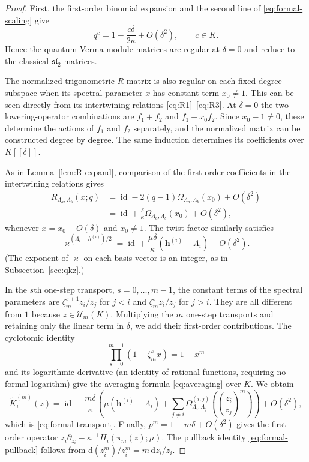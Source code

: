 \documentclass[12pt]{amsart}
\let\frak\mathfrak
\theoremstyle{definition}
\numberwithin{equation}{section}
\theoremstyle{definition}
\let\mc\mathcal
\let\ka\kappa
\let\La\Lambda
\let\Om\Omega
\let\on\operatorname
\def\id{\on{id}}
\def\slt{{\frak{sl}_2}}
\begin{document}
\begin{proof}
First, the first-order binomial expansion and the second
line of \eqref{eq:formal-scaling} give
\[
 q^c=1-\frac{c\delta}{2\ka}+O(\delta^2),\qquad c\in K.
\]
Hence the quantum Verma-module matrices are regular at
$\delta=0$ and reduce to the classical $\slt$ matrices.

The normalized trigonometric $R$-matrix is also regular on each
fixed-degree subspace when its spectral parameter $x$ has
constant term $x_0\ne1$.  This can be seen directly from its
intertwining relations \eqref{eq:R1}--\eqref{eq:R3}.  At
$\delta=0$ the two lowering-operator combinations are
$f_1+f_2$ and $f_1+x_0f_2$.
Since $x_0-1\ne0$, these determine the actions of $f_1$
and $f_2$ separately, and the normalized matrix can be
constructed degree by degree.  The same induction determines
its coefficients over $K[[\delta]]$.

As in Lemma~\ref{lem:R-expand}, comparison of the
first-order coefficients in the intertwining relations gives
\[
\begin{aligned}
 R_{\La_a,\La_b}(x;q)
  &=\id-2(q-1)\Om_{\La_a,\La_b}(x_0)+O(\delta^2)\\
  &=\id+\frac{\delta}{\ka}\Om_{\La_a,\La_b}(x_0)
    +O(\delta^2),
\end{aligned}
\]
whenever $x=x_0+O(\delta)$ and $x_0\ne1$.
The twist factor similarly satisfies
\[
 \varkappa^{(\La_i-h^{(i)})/2}
 =\id+\frac{\mu\delta}{\ka}
       (\mathbf h^{(i)}-\La_i)+O(\delta^2).
\]
(The exponent of $\varkappa$ on each basis vector is an
integer, as in Subsection~\ref{sec:qkz}.)

In the $s$th one-step transport, $s=0,\ldots,m-1$,
the constant terms of the spectral parameters are
$\zeta_m^{s+1}z_i/z_j$ for $j<i$ and
$\zeta_m^sz_i/z_j$ for $j>i$.  They are all different
from $1$ because $z\in\mc U_m(K)$.
Multiplying the $m$ one-step transports and retaining only
the linear term in $\delta$, we add their first-order
contributions.  The cyclotomic identity
\[
 \prod_{s=0}^{m-1}(1-\zeta_m^s x)=1-x^m
\]
and its logarithmic derivative (an identity of rational
functions, requiring no formal logarithm) give the averaging
formula \eqref{eq:averaging} over $K$.  We obtain
\[
 \widetilde K_i^{(m)}(z)
 =\id+\frac{m\delta}{\ka}
 \left(\mu(\mathbf h^{(i)}-\La_i)
   +\sum_{j\ne i}\Om^{(i,j)}_{\La_i,\La_j}
       \left(\left(\frac{z_i}{z_j}\right)^m\right)\right)
       +O(\delta^2),
\]
which is \eqref{eq:formal-transport}.
Finally, $p^m=1+m\delta+O(\delta^2)$ gives the
first-order operator
$z_i\partial_{z_i}-\ka^{-1}H_i(\pi_m(z);\mu)$.
The pullback identity \eqref{eq:formal-pullback} follows
from $\mathrm d(z_i^m)/z_i^m=m\,\mathrm dz_i/z_i$.
\end{proof}
\end{document}
